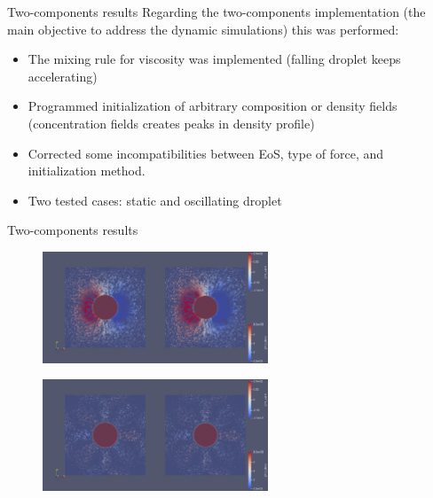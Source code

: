 \documentclass{beamer}
\begin{document}
	
	\begin{frame}{Two-components results}
		Regarding the two-components implementation (the main objective to address the dynamic simulations) this was performed:
		
		\begin{itemize}
			\item The mixing rule for viscosity was implemented (falling droplet keeps accelerating)
			\item Programmed initialization of arbitrary composition or density fields (concentration fields creates peaks in density profile)
			\item Corrected some incompatibilities between EoS, type of force, and initialization method.
			\item Two tested cases: static and oscillating droplet
		\end{itemize}
	\end{frame}
	
	\begin{frame}{Two-components results}
		\begin{figure}
			\centering
			\includegraphics[width=0.60\textwidth]{pics/TwoCMP_MRT_StaticvsOsc.png}
		\end{figure}
	
		\begin{figure}
			\centering
			\includegraphics[width=0.6\textwidth]{pics/TwoCMP_MRT_StaticvsOscEq.png}
		\end{figure}
	\end{frame}
\end{document}
